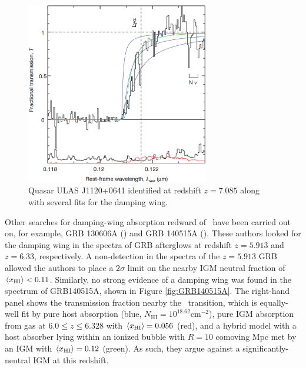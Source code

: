 \begin{figure}[h]
  \centering
  \includegraphics[width=8cm]{z7p085_DampingWing.eps}
  \caption{Quasar ULAS J1120+0641 identified at redshift $z = 7.085$ along with several fits for the damping wing.}
  \label{fig:Mortlock}
\end{figure}


Other searches for damping-wing absorption redward of \lya\ have been carried out on, for example, GRB 130606A (\citealt{Chornock:2013una}) and GRB 140515A (\citealt{Chornock:2014fva}). These authors looked for the damping wing in the spectra of GRB afterglows at redshift $z = 5.913$ and $z = 6.33$, respectively. A non-detection in the spectra of the $z = 5.913$ GRB allowed the authors to place a $2\sigma$ limit on the nearby IGM neutral fraction of $\langle x_{\text{HI}}\rangle < 0.11$. Similarly, no strong evidence of a damping wing was found in the spectrum of GRB140515A, shown in Figure \ref{fig:GRB140515A}. The right-hand panel shows the transmission fraction nearby the \lya\ transition, which is equally-well fit by pure host absorption (blue, $N_{\text{HI}} = 10^{18.62}\text{cm}^{-2}$), pure IGM absorption from gas at $6.0 \leq z \leq 6.328$ with $\langle x_{\text{HI}}\rangle = 0.056$ (red), and a hybrid model with a host absorber lying within an ionized bubble with $R = 10$ comoving Mpc met by an IGM with $\langle x_{\text{HI}}\rangle = 0.12$ (green). As such, they argue against a significantly-neutral IGM at this redshift.  

